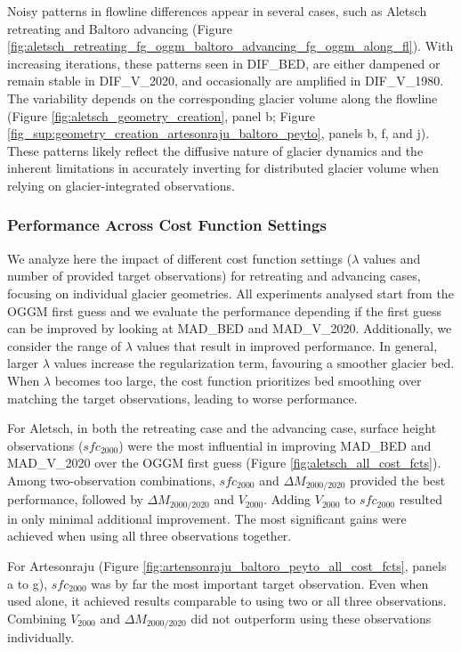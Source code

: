 \documentclass[journal abbreviation, manuscript]{copernicus}
\begin{document}
Noisy patterns in flowline differences appear in several cases, such as Aletsch retreating and Baltoro advancing (Figure \ref{fig:aletsch_retreating_fg_oggm_baltoro_advancing_fg_oggm_along_fl}). With increasing iterations, these patterns seen in DIF\_BED, are either dampened or remain stable in DIF\_V\_2020, and occasionally are amplified in DIF\_V\_1980. The variability depends on the corresponding glacier volume along the flowline (Figure \ref{fig:aletsch_geometry_creation}, panel b; Figure \ref{fig_sup:geometry_creation_artesonraju_baltoro_peyto}, panels b, f, and j). These patterns likely reflect the diffusive nature of glacier dynamics and the inherent limitations in accurately inverting for distributed glacier volume when relying on glacier-integrated observations.


\subsubsection{Performance Across Cost Function Settings}
\label{subsec:differenc_cost_settings_all_geometries}

We analyze here the impact of different cost function settings ($\lambda$ values and number of provided target observations) for retreating and advancing cases, focusing on individual glacier geometries. All experiments analysed start from the OGGM first guess and we evaluate the performance depending if the first guess can be improved by looking at MAD\_BED and MAD\_V\_2020. Additionally, we consider the range of $\lambda$ values that result in improved performance. In general, larger $\lambda$ values increase the regularization term, favouring a smoother glacier bed. When $\lambda$ becomes too large, the cost function prioritizes bed smoothing over matching the target observations, leading to worse performance.

For Aletsch, in both the retreating case and the advancing case, surface height observations ($sfc_{2000}$) were the most influential in improving MAD\_BED and MAD\_V\_2020 over the OGGM first guess (Figure \ref{fig:aletsch_all_cost_fcts}). Among two-observation combinations, $sfc_{2000}$ and $\Delta M_{2000/2020}$ provided the best performance, followed by $\Delta M_{2000/2020}$ and $V_{2000}$. Adding $V_{2000}$ to $sfc_{2000}$ resulted in only minimal additional improvement. The most significant gains were achieved when using all three observations together.

For Artesonraju (Figure \ref{fig:artensonraju_baltoro_peyto_all_cost_fcts}, panels a to g), $sfc_{2000}$ was by far the most important target observation. Even when used alone, it achieved results comparable to using two or all three observations. Combining $V_{2000}$ and $\Delta M_{2000/2020}$ did not outperform using these observations individually.
\end{document}
